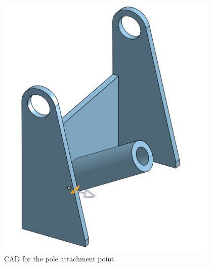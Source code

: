 \begin{figure}[ht]
\begin{minipage}[b]{.48\textwidth}
  \includegraphics[width=0.95\textwidth]{Meetings/November/11-18-21/11-18-21_CAD_Figure2 - Nathan Forrer.JPG}
  \caption{CAD for the pole attachment point}
  \label{fig:111821_2}
\end{minipage}
\end{figure}

